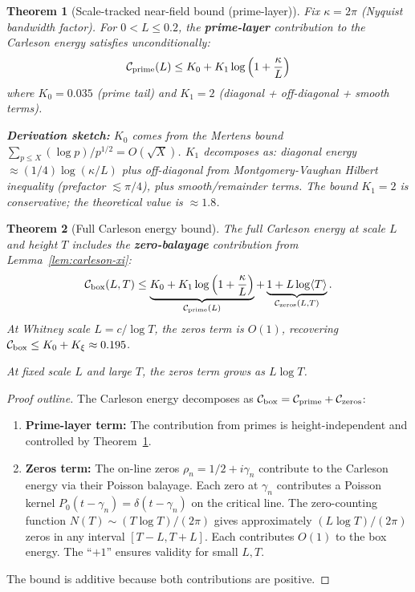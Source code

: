 \documentclass[11pt]{article}
\newtheorem{theorem}{Theorem}
\theoremstyle{definition}
\theoremstyle{remark}
\theoremstyle{definition}
\begin{document}
\begin{theorem}[Scale-tracked near-field bound (prime-layer)]\label{thm:scale-tracked-final}
Fix $\kappa = 2\pi$ (Nyquist bandwidth factor). For $0 < L \le 0.2$, the \textbf{prime-layer} contribution to the Carleson energy satisfies unconditionally:
\begin{equation}\label{eq:scale-tracked-bound}
  \mathcal{C}_{\rm prime}(L) \le K_0 + K_1\log\left(1 + \frac{\kappa}{L}\right)
\end{equation}
where $K_0 = 0.035$ (prime tail) and $K_1 = 2$ (diagonal + off-diagonal + smooth terms).

\textbf{Derivation sketch:} $K_0$ comes from the Mertens bound $\sum_{p \le X}(\log p)/p^{1/2} = O(\sqrt{X})$. $K_1$ decomposes as: diagonal energy $\approx (1/4)\log(\kappa/L)$ plus off-diagonal from Montgomery-Vaughan Hilbert inequality (prefactor $\lesssim \pi/4$), plus smooth/remainder terms. The bound $K_1 = 2$ is conservative; the theoretical value is $\approx 1.8$.
\end{theorem}

\begin{theorem}[Full Carleson energy bound]\label{thm:full-carleson}
The full Carleson energy at scale $L$ and height $T$ includes the \textbf{zero-balayage} contribution from Lemma~\ref{lem:carleson-xi}:
\begin{equation}\label{eq:full-carleson-bound}
  \mathcal{C}_{\rm box}(L, T) \le \underbrace{K_0 + K_1\log\left(1 + \frac{\kappa}{L}\right)}_{\mathcal{C}_{\rm prime}(L)} + \underbrace{1 + L\log\langle T\rangle}_{\mathcal{C}_{\rm zeros}(L,T)}.
\end{equation}
At Whitney scale $L = c/\log T$, the zeros term is $O(1)$, recovering $\mathcal{C}_{\rm box} \le K_0 + K_\xi \approx 0.195$.

At fixed scale $L$ and large $T$, the zeros term grows as $L\log T$.
\end{theorem}
\begin{proof}[Proof outline]
The Carleson energy decomposes as $\mathcal{C}_{\rm box} = \mathcal{C}_{\rm prime} + \mathcal{C}_{\rm zeros}$:
\begin{enumerate}
\item \textbf{Prime-layer term:} The contribution from primes is height-independent and controlled by Theorem~\ref{thm:scale-tracked-final}.
\item \textbf{Zeros term:} The on-line zeros $\rho_n = 1/2 + i\gamma_n$ contribute to the Carleson energy via their Poisson balayage. Each zero at $\gamma_n$ contributes a Poisson kernel $P_0(t - \gamma_n) = \delta(t - \gamma_n)$ on the critical line. The zero-counting function $N(T) \sim (T\log T)/(2\pi)$ gives approximately $(L \log T)/(2\pi)$ zeros in any interval $[T - L, T + L]$. Each contributes $O(1)$ to the box energy. The ``$+1$'' ensures validity for small $L, T$.
\end{enumerate}
The bound is additive because both contributions are positive.
\end{proof}
\end{document}
